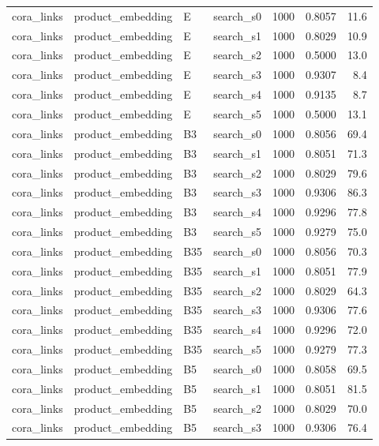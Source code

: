 \begin{longtable}{llllrrr}
cora\_links & product\_embedding & E & search\_s0 & 1000 & 0.8057 & 11.6 \\
cora\_links & product\_embedding & E & search\_s1 & 1000 & 0.8029 & 10.9 \\
cora\_links & product\_embedding & E & search\_s2 & 1000 & 0.5000 & 13.0 \\
cora\_links & product\_embedding & E & search\_s3 & 1000 & 0.9307 & 8.4 \\
cora\_links & product\_embedding & E & search\_s4 & 1000 & 0.9135 & 8.7 \\
cora\_links & product\_embedding & E & search\_s5 & 1000 & 0.5000 & 13.1 \\
cora\_links & product\_embedding & B3 & search\_s0 & 1000 & 0.8056 & 69.4 \\
cora\_links & product\_embedding & B3 & search\_s1 & 1000 & 0.8051 & 71.3 \\
cora\_links & product\_embedding & B3 & search\_s2 & 1000 & 0.8029 & 79.6 \\
cora\_links & product\_embedding & B3 & search\_s3 & 1000 & 0.9306 & 86.3 \\
cora\_links & product\_embedding & B3 & search\_s4 & 1000 & 0.9296 & 77.8 \\
cora\_links & product\_embedding & B3 & search\_s5 & 1000 & 0.9279 & 75.0 \\
cora\_links & product\_embedding & B35 & search\_s0 & 1000 & 0.8056 & 70.3 \\
cora\_links & product\_embedding & B35 & search\_s1 & 1000 & 0.8051 & 77.9 \\
cora\_links & product\_embedding & B35 & search\_s2 & 1000 & 0.8029 & 64.3 \\
cora\_links & product\_embedding & B35 & search\_s3 & 1000 & 0.9306 & 77.6 \\
cora\_links & product\_embedding & B35 & search\_s4 & 1000 & 0.9296 & 72.0 \\
cora\_links & product\_embedding & B35 & search\_s5 & 1000 & 0.9279 & 77.3 \\
\rowcolor{oursbg}
cora\_links & product\_embedding & B5 & search\_s0 & 1000 & 0.8058 & 69.5 \\
\rowcolor{oursbg}
cora\_links & product\_embedding & B5 & search\_s1 & 1000 & 0.8051 & 81.5 \\
\rowcolor{oursbg}
cora\_links & product\_embedding & B5 & search\_s2 & 1000 & 0.8029 & 70.0 \\
\rowcolor{oursbg}
cora\_links & product\_embedding & B5 & search\_s3 & 1000 & 0.9306 & 76.4 \\

\end{longtable}
